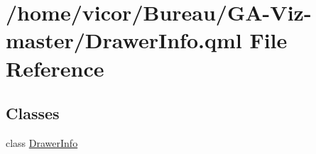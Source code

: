 \hypertarget{_drawer_info_8qml}{}\section{/home/vicor/\+Bureau/\+G\+A-\/\+Viz-\/master/\+Drawer\+Info.qml File Reference}
\label{_drawer_info_8qml}
\subsection*{Classes}
\begin{DoxyCompactItemize}
\item 
class \hyperlink{class_drawer_info}{Drawer\+Info}
\end{DoxyCompactItemize}
